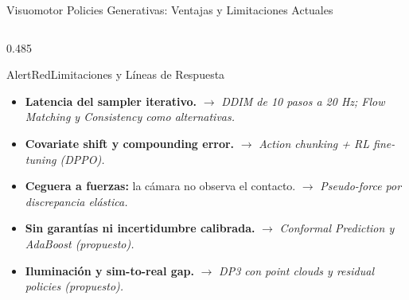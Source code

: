 \documentclass[aspectratio=169,10pt,xcolor={dvipsnames,table}]{beamer}
\newcommand{\CardHeightDouble}{42.5mm}     %
\newcommand{\CrossMark}{\textcolor{AlertRed}{$\times$}}
\begin{document}
\begin{frame}{Visuomotor Policies Generativas: Ventajas y Limitaciones Actuales}
\begin{columns}[T, onlytextwidth]
\begin{column}{0.485\textwidth}
\begin{Card}[height=\CardHeightDouble]{AlertRed}{Limitaciones y Líneas de Respuesta}
{\begin{itemize}
          \item[\CrossMark] \textbf{Latencia del sampler iterativo.} $\to$ \textcolor{AgriGreenDark}{\textit{DDIM de 10 pasos a 20 Hz; Flow Matching y Consistency como alternativas.}}
          \item[\CrossMark] \textbf{Covariate shift y compounding error.} $\to$ \textcolor{AgriGreenDark}{\textit{Action chunking + RL fine-tuning (DPPO).}}
          \item[\CrossMark] \textbf{Ceguera a fuerzas:} la cámara no observa el contacto. $\to$ \textcolor{AgriGreenDark}{\textit{Pseudo-force por discrepancia elástica.}}
          \item[\CrossMark] \textbf{Sin garantías ni incertidumbre calibrada.} $\to$ \textcolor{AgriGreenDark}{\textit{Conformal Prediction y AdaBoost (propuesto).}}
          \item[\CrossMark] \textbf{Iluminación y sim-to-real gap.} $\to$ \textcolor{AgriGreenDark}{\textit{DP3 con point clouds y residual policies (propuesto).}}
        \end{itemize}}
      \end{Card}
    \end{column}
  \end{columns}
\end{frame}
\end{document}
